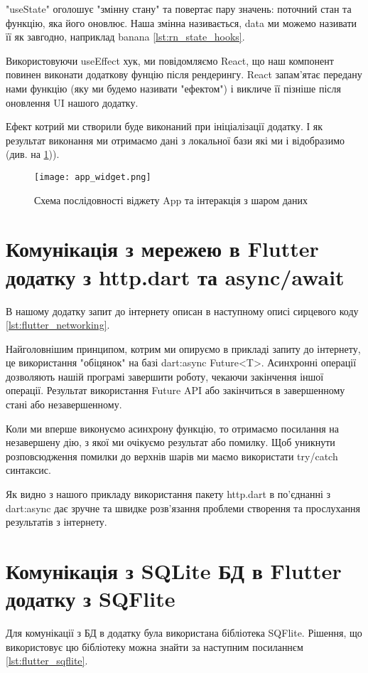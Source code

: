 "useState" оголошує "змінну стану" та повертає пару значень: поточний стан та функцію, яка його оновлює.
Наша змінна називається, data ми можемо називати її як завгодно, наприклад banana \ref{lst:rn_state_hooks}.

Використовуючи useEffect хук, ми повідомляємо React, що наш компонент повинен виконати додаткову фунцію після рендерингу.
React запам'ятає передану нами функцію (яку ми будемо називати "ефектом") і викличе її пізніше після оновлення UI нашого додатку.

Ефект котрий ми створили буде виконаний при ініціалізації додатку. І як результат виконання ми отримаємо дані з локальної бази які ми і відобразимо (див. на \ref{fig:rn_realm})).

\begin{figure}
    \begin{center}
        \texttt{[image: app\_widget.png]}
        \caption{Схема послідовності віджету App та інтеракція з шаром даних}
        \label{fig:rn_realm}
    \end{center}
\end{figure}


\section{Комунікація з мережею в Flutter додатку з http.dart та async/await}
\label{sec:flutter_network_app}
В нашому додатку запит до інтернету описан в наступному описі сирцевого коду \ref{lst:flutter_networking}.

Найголовнішим принципом, котрим ми опируємо в прикладі запиту до інтернету, це використання "обіцянок" на базі dart:async Future<T>.
Асинхронні операції дозволяють нашій програмі завершити роботу, чекаючи закінчення іншої операції.
Результат використання Future API або закінчиться в завершенному стані або незавершенному.

Коли ми вперше виконуємо асинхрону функцію, то отримаємо посилання на незавершену дію, з якої ми очікуємо результат або помилку.
Щоб уникнути розповсюдження помилки до верхнів шарів ми маємо використати try/catch синтаксис.

Як видно з нашого прикладу використання пакету http.dart в по'єднанні з dart:async дає зручне
та швидке розв'язання проблеми створення та прослухання результатів з інтернету.


\section{Комунікація з SQLite БД в Flutter додатку з SQFlite}
\label{sec:flutter_sqflite_app}
Для комунікації з БД в додатку була використана бібліотека SQFlite.
Рішення, що використовує цю бібліотеку можна знайти за наступним посиланнєм \ref{lst:flutter_sqflite}.

